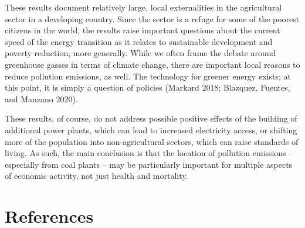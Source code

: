 \documentclass[
]{article}
\begin{document}
These results document relatively large, local externalities in the agricultural sector in a developing country. Since the sector is a refuge for some of the poorest citizens in the world, the results raise important questions about the current speed of the energy transition as it relates to sustainable development and poverty reduction, more generally. While we often frame the debate around greenhouse gasses in terms of climate change, there are important local reasons to reduce pollution emissions, as well. The technology for greener energy exists; at this point, it is simply a question of policies (Markard 2018; Blazquez, Fuentes, and Manzano 2020).

These results, of course, do not address possible positive effects of the building of additional power plants, which can lead to increased electricity access, or shifting more of the population into non-agricultural sectors, which can raise standards of living. As such, the main conclusion is that the location of pollution emissions -- especially from coal plants -- may be particularly important for multiple aspects of economic activity, not just health and mortality.

\FloatBarrier
\newpage
\singlespacing

\hypertarget{references}{%
\section*{References}\label{references}}
\end{document}
